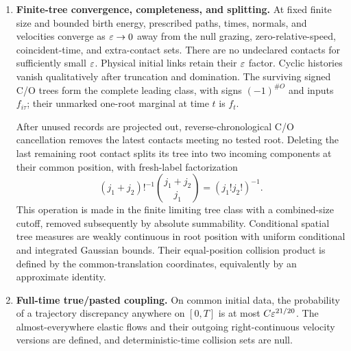 \begin{enumerate}[label=H\arabic*.,ref=H\arabic*,leftmargin=2.8em]
\item\label{H:trees}\textbf{Finite-tree convergence, completeness, and splitting.}
At fixed finite size and bounded birth energy, prescribed paths, times,
normals, and velocities converge as $\varepsilon\to0$ away from the null grazing,
zero-relative-speed, coincident-time, and extra-contact sets. There are no
undeclared contacts for sufficiently small $\varepsilon$. Physical initial links
retain their $\varepsilon$ factor. Cyclic histories vanish qualitatively after
truncation and domination. The surviving signed C/O trees form the complete
leading class, with signs $(-1)^{\#O}$ and inputs $f_{i\tau}$; their unmarked
one-root marginal at time $t$ is $f_t$.

After unused records are projected out, reverse-chronological C/O cancellation
removes the latest contacts meeting no tested root. Deleting the last
remaining root contact splits its tree into two incoming components at their
common position, with fresh-label factorization
\[
 (j_1+j_2)!^{-1}\binom{j_1+j_2}{j_1}=(j_1!j_2!)^{-1}.
\]
This operation is made in the finite limiting tree class with a combined-size
cutoff, removed subsequently by absolute summability. Conditional spatial
tree measures are weakly continuous in root position with uniform
conditional and integrated Gaussian bounds. Their equal-position collision
product is defined by the common-translation coordinates, equivalently by
an approximate identity.

\item\label{H:coupling}\textbf{Full-time true/pasted coupling.}
On common initial data, the probability of a trajectory discrepancy anywhere
on $[0,T]$ is at most $C\varepsilon^{21/20}$. The almost-everywhere elastic flows
and their outgoing right-continuous velocity versions are defined, and
deterministic-time collision sets are null.
\end{enumerate}

